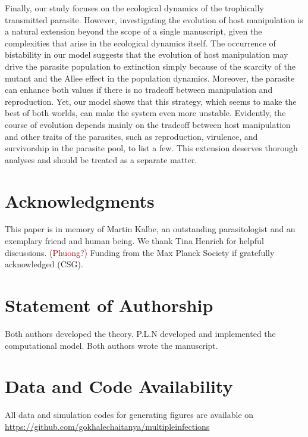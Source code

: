 \documentclass[11pt]{article}
\newcommand{\cha}[1]{\textcolor{darkred}{(#1)}}
\begin{document}
Finally, our study focuses on the ecological dynamics of the trophically transmitted parasite. 
However, investigating the evolution of host manipulation is a natural extension beyond the scope of a single manuscript, given the complexities that arise in the ecological dynamics itself. 
The occurrence of bistability in our model suggests that the evolution of host manipulation may drive the parasite population to extinction simply because of the scarcity of the mutant and the Allee effect in the population dynamics. 
Moreover, the parasite can enhance both values if there is no tradeoff between manipulation and reproduction. 
Yet, our model shows that this strategy, which seems to make the best of both worlds, can make the system even more unstable. 
Evidently, the course of evolution depends mainly on the tradeoff between host manipulation and other traits of the parasites, such as reproduction, virulence, and survivorship in the parasite pool, to list a few. This extension deserves thorough analyses and should be treated as a separate matter.




 \section*{Acknowledgments}
This paper is in memory of Martin Kalbe, an outstanding parasitologist and an exemplary friend and human being.
We thank Tina Henrich for helpful discussions.
\cha{Phuong?}
Funding from the Max Planck Society if gratefully acknowledged (CSG).

 \section*{Statement of Authorship}
Both authors developed the theory.
P.L.N developed and implemented the computational model.
Both authors wrote the manuscript.
 
\section*{Data and Code Availability}
All data and simulation codes for generating figures are available on 
\url{https://github.com/gokhalechaitanya/multipleinfections}
\end{document}

